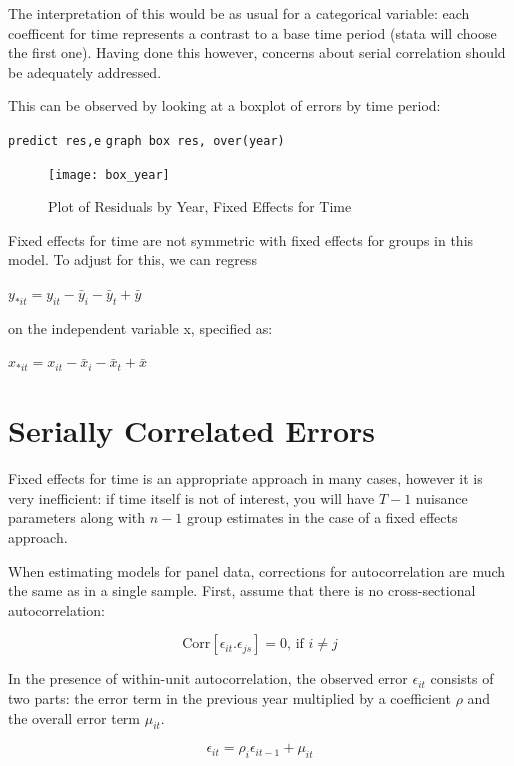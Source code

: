 \documentclass[12pt]{article}
\begin{document}
The interpretation of this would be as usual for a categorical
variable: each coefficent for time represents a contrast to a base
time period (stata will choose the first one). Having done this
however, concerns about serial correlation should be adequately
addressed. 

 This can be observed by looking at a boxplot of errors by
 time period:

 \texttt{predict res,e}
 \texttt{graph box res, over(year)}


 \begin{figure}
   \centering
   \texttt{[image: box\_year]}
   \caption{Plot of Residuals by Year, Fixed Effects for Time}
   \label{fig:fetime}
 \end{figure}

Fixed effects for time are not symmetric with fixed effects for groups
in this model. To adjust for this, we can regress 

$y_{*it}= y_{it}-\bar{y}_{i}-\bar{y}_{t}+\bar{y}$

on the independent variable x, specified as: 

$x_{*it}= x_{it}-\bar{x}_{i}-\bar{x}_{t}+\bar{x}$


\section{Serially Correlated Errors}

Fixed effects for time is an appropriate approach in many cases,
however it is very inefficient: if time itself is not of interest, you
will have $T-1$ nuisance parameters along with $n-1$ group estimates
in the case of a fixed effects approach. 

When estimating models for panel data, corrections for autocorrelation
are much the same as in a single sample. First, assume that there is
no cross-sectional autocorrelation:

\begin{equation*}
  \label{eq:noauto}
  \text{Corr}[\epsilon_{it}.\epsilon_{js}]=0 \text{, if } i \neq j
\end{equation*}

In the presence of within-unit autocorrelation, the observed error $\epsilon_{it}$
consists of two parts: the error term in the previous year multiplied
by a coefficient $\rho$ and the overall error term $\mu_{it}$.

\begin{equation*}
  \label{eq:ar1}
  \epsilon_{it}=\rho_i \epsilon_{it-1}+\mu_{it}
\end{equation*}
\end{document}
